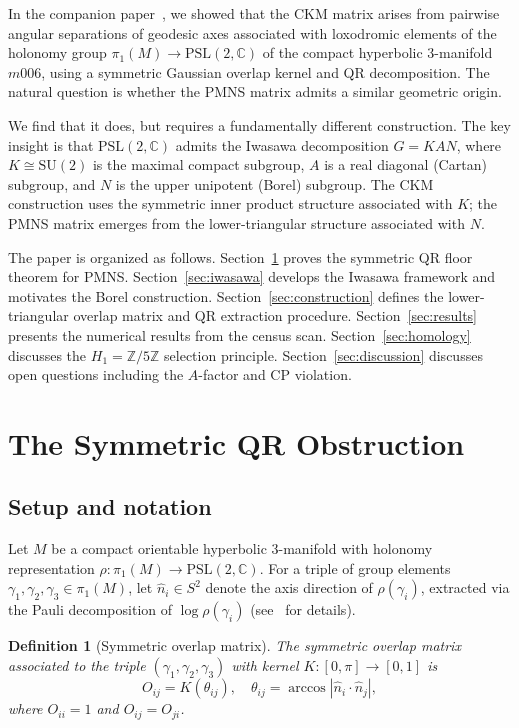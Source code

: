 \documentclass[floatfix,aps,prd,twocolumn,showpacs,superscriptaddress,longbibliography]{revtex4-2}
\newtheorem{definition}{Definition}
\newcommand{\PSL}{\mathrm{PSL}(2,\mathbb{C})}
\newcommand{\SUtwo}{\mathrm{SU}(2)}
\newcommand{\Zfive}{\mathbb{Z}/5\mathbb{Z}}
\newcommand{\abs}[1]{\left|#1\right|}
\begin{document}
In the companion paper~\cite{Gentry:CKM}, we showed that the CKM matrix
arises from pairwise angular separations of geodesic axes associated with
loxodromic elements of the holonomy group $\pi_1(M) \to \PSL$ of the
compact hyperbolic 3-manifold $m006$, using a symmetric Gaussian overlap
kernel and QR decomposition. The natural question is whether the PMNS
matrix admits a similar geometric origin.

We find that it does, but requires a fundamentally different construction.
The key insight is that $\PSL$ admits the Iwasawa decomposition
$G = KAN$, where $K \cong \SUtwo$ is the maximal compact subgroup,
$A$ is a real diagonal (Cartan) subgroup, and $N$ is the upper unipotent
(Borel) subgroup. The CKM construction uses the symmetric inner product
structure associated with $K$; the PMNS matrix emerges from the
lower-triangular structure associated with $N$.

The paper is organized as follows. Section~\ref{sec:obstruction} proves the
symmetric QR floor theorem for PMNS. Section~\ref{sec:iwasawa} develops the
Iwasawa framework and motivates the Borel construction. 
Section~\ref{sec:construction} defines the lower-triangular overlap matrix
and QR extraction procedure. Section~\ref{sec:results} presents the
numerical results from the census scan. Section~\ref{sec:homology} discusses
the $H_1 = \Zfive$ selection principle. Section~\ref{sec:discussion}
discusses open questions including the $A$-factor and CP violation.

\section{The Symmetric QR Obstruction}
\label{sec:obstruction}

\subsection{Setup and notation}

Let $M$ be a compact orientable hyperbolic 3-manifold with holonomy
representation $\rho: \pi_1(M) \to \PSL$.
For a triple of group elements $\gamma_1, \gamma_2, \gamma_3 \in \pi_1(M)$,
let $\hat{n}_i \in S^2$ denote the axis direction of $\rho(\gamma_i)$,
extracted via the Pauli decomposition of $\log \rho(\gamma_i)$
(see~\cite{Gentry:CKM} for details).

\begin{definition}[Symmetric overlap matrix]
The symmetric overlap matrix associated to the triple $(\gamma_1,\gamma_2,\gamma_3)$
with kernel $K: [0,\pi] \to [0,1]$ is
\begin{equation}
  O_{ij} = K\!\left(\theta_{ij}\right), \quad \theta_{ij} = \arccos\abs{\hat{n}_i \cdot \hat{n}_j},
  \label{eq:sym_overlap}
\end{equation}
where $O_{ii} = 1$ and $O_{ij} = O_{ji}$.
\end{definition}
\end{document}
